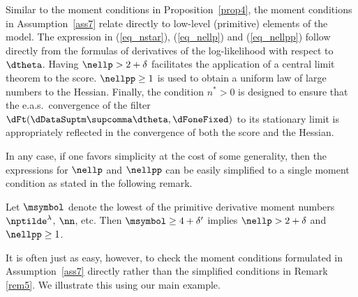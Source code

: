 Similar to the moment conditions in Proposition~\ref{prop4}, the moment
conditions in Assumption~\ref{ass7} relate directly to low-level (primitive) elements of the model. The expression in (\ref{eq_nstar}),  (\ref{eq_nellp}) and (\ref{eq_nellpp}) follow directly from the formulas of derivatives of the 
log-likelihood with respect to $\dtheta$. 
Having $\nellp > 2+\delta$ facilitates the application of a central limit theorem to the score. $\nellpp\geq 1$ is used to obtain a uniform law of large numbers to the Hessian. Finally, the condition $n^{*}>0$ is designed to ensure that the e.a.s.~convergence of the filter $\dFt(\dDataSuptm\supcomma\dtheta,\dFoneFixed)$ to its stationary limit is appropriately reflected in the convergence of both the score and the Hessian.

In any case, if one favors simplicity at the cost of some generality, then  the expressions for $\nellp$ and $\nellpp$ can be easily simplified to a single moment condition as stated in the following remark.

\begin{rem} \rm
\label{rem5}
Let $\msymbol$ denote the lowest of the primitive derivative moment numbers $\nptilde^{\lambda}$, $\nn$,  etc. Then $\msymbol \geq 4+\delta'$ implies $\nellp> 2+\delta$ and $\nellpp \geq 1$.
\end{rem}

\noindent It is often just as easy, however, to check the moment conditions formulated in Assumption~\ref{ass7} 
directly rather than the simplified conditions in Remark \ref{rem5}. We illustrate this using our main example.

